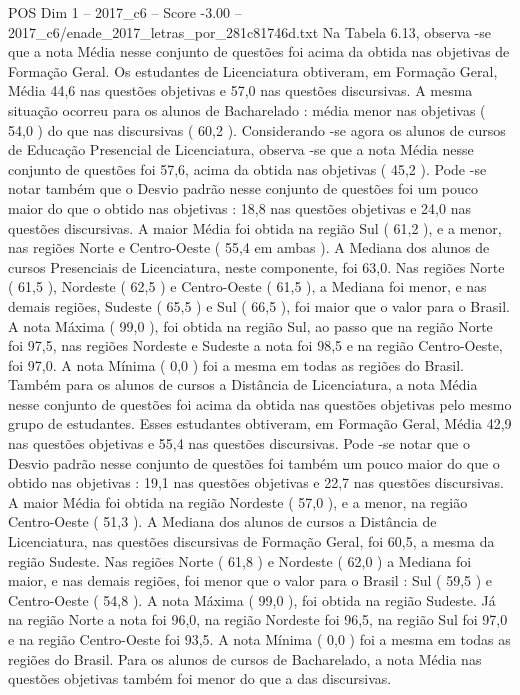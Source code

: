 \begin{textsample}{POS Dim 1 – 2017\_c6 – Score -3.00 – 2017\_c6/enade\_2017\_letras\_por\_281c81746d.txt}
Na Tabela 6.13, observa -se que a nota Média nesse conjunto de questões foi acima da obtida nas objetivas de Formação Geral.
Os estudantes de Licenciatura obtiveram, em Formação Geral, Média 44,6 nas questões objetivas e 57,0 nas questões discursivas.
A mesma situação ocorreu para os alunos de Bacharelado : média menor nas objetivas ( 54,0 ) do que nas discursivas ( 60,2 ).
Considerando -se agora os alunos de cursos de Educação Presencial de Licenciatura, observa -se que a nota Média nesse conjunto de questões foi 57,6, acima da obtida nas objetivas ( 45,2 ).
Pode -se notar também que o Desvio padrão nesse conjunto de questões foi um pouco maior do que o obtido nas objetivas : 18,8 nas questões objetivas e 24,0 nas questões discursivas.
A maior Média foi obtida na região Sul ( 61,2 ), e a menor, nas regiões Norte e Centro-Oeste ( 55,4 em ambas ).
A Mediana dos alunos de cursos Presenciais de Licenciatura, neste componente, foi 63,0.
Nas regiões Norte ( 61,5 ), Nordeste ( 62,5 ) e Centro-Oeste ( 61,5 ), a Mediana foi menor, e nas demais regiões, Sudeste ( 65,5 ) e Sul ( 66,5 ), foi maior que o valor para o Brasil.
A nota Máxima ( 99,0 ), foi obtida na região Sul, ao passo que na região Norte foi 97,5, nas regiões Nordeste e Sudeste a nota foi 98,5 e na região Centro-Oeste, foi 97,0.
A nota Mínima ( 0,0 ) foi a mesma em todas as regiões do Brasil.
Também para os alunos de cursos a Distância de Licenciatura, a nota Média nesse conjunto de questões foi acima da obtida nas questões objetivas pelo mesmo grupo de estudantes.
Esses estudantes obtiveram, em Formação Geral, Média 42,9 nas questões objetivas e 55,4 nas questões discursivas.
Pode -se notar que o Desvio padrão nesse conjunto de questões foi também um pouco maior do que o obtido nas objetivas : 19,1 nas questões objetivas e 22,7 nas questões discursivas.
A maior Média foi obtida na região Nordeste ( 57,0 ), e a menor, na região Centro-Oeste ( 51,3 ).
A Mediana dos alunos de cursos a Distância de Licenciatura, nas questões discursivas de Formação Geral, foi 60,5, a mesma da região Sudeste.
Nas regiões Norte ( 61,8 ) e Nordeste ( 62,0 ) a Mediana foi maior, e nas demais regiões, foi menor que o valor para o Brasil : Sul ( 59,5 ) e Centro-Oeste ( 54,8 ).
A nota Máxima ( 99,0 ), foi obtida na região Sudeste.
Já na região Norte a nota foi 96,0, na região Nordeste foi 96,5, na região Sul foi 97,0 e na região Centro-Oeste foi 93,5.
A nota Mínima ( 0,0 ) foi a mesma em todas as regiões do Brasil.
Para os alunos de cursos de Bacharelado, a nota Média nas questões objetivas também foi menor do que a das discursivas.

\end{textsample}

